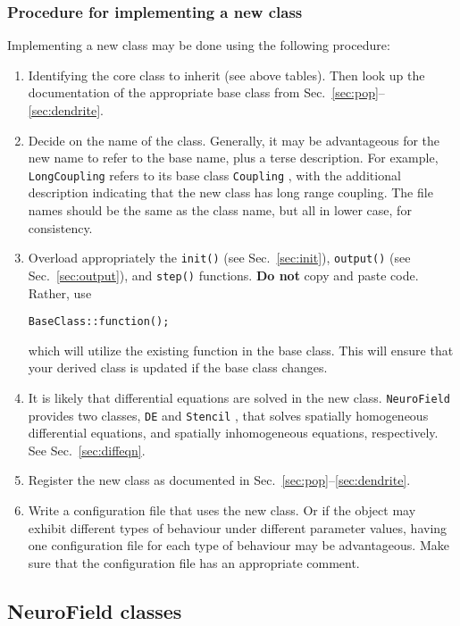 \documentclass[12pt,a4paper]{article}
\newcommand{\type}[1]{{\small\small\tt #1} }
\newcommand{\NF}[0]{\type{NeuroField}}
\begin{document}
\subsubsection{Procedure for implementing a new class}

Implementing a new class may be done using the following procedure:
\begin{enumerate}
    \item Identifying the core class to inherit (see above tables). Then look up the documentation of the appropriate base class from Sec.~\ref{sec:pop}--\ref{sec:dendrite}.
    \item Decide on the name of the class. Generally, it may be advantageous for the new name to refer to the base name, plus a terse description. For example, \type{LongCoupling} refers to its base class \type{Coupling}, with the additional description indicating that the new class has long range coupling. The file names should be the same as the class name, but all in lower case, for consistency.
    \item Overload appropriately the \type{init()} (see Sec.~\ref{sec:init}), \type{output()} (see Sec.~\ref{sec:output}), and \type{step()} functions. {\bf Do not} copy and paste code. Rather, use
        \begin{lstlisting}
BaseClass::function();
        \end{lstlisting}
    which will utilize the existing function in the base class. This will ensure that your derived class is updated if the base class changes.
    \item It is likely that differential equations are solved in the new class. \NF provides two classes, \type{DE} and \type{Stencil}, that solves spatially homogeneous differential equations, and spatially inhomogeneous equations, respectively. See Sec.~\ref{sec:diffeqn}.
    \item Register the new class as documented in Sec.~\ref{sec:pop}--\ref{sec:dendrite}.
    \item Write a configuration file that uses the new class. Or if the object may exhibit different types of behaviour under different parameter values, having one configuration file for each type of behaviour may be advantageous. Make sure that the configuration file has an appropriate comment.
\end{enumerate}

\subsection{NeuroField classes}
\end{document}
